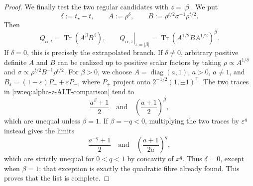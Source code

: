 \documentclass[11pt]{article}
\theoremstyle{remark}
\newcommand{\1}{\mathbbm{1}}
\begin{document}
\begin{proof}
We finally test the two regular candidates with
$z=\lvert\beta\rvert$.  We put
\begin{equation}
 \delta:=t_\star-t,\qquad
 A:=\rho^\delta,\qquad
 B:=\rho^{t/2}\sigma^{-1}\rho^{t/2}.
 \label{rw:eq:real-t-ALT-variables}
\end{equation}
Then
\begin{equation}
 Q_{\alpha,t}=\operatorname{Tr}(A^\beta B^\beta),
 \qquad
 \left.Q_{\alpha,z}\right|_{z=\lvert\beta\rvert}
 =\operatorname{Tr}(A^{1/2}BA^{1/2})^\beta.
 \label{rw:eq:alpha-z-ALT-comparison}
\end{equation}
If $\delta=0$, this is precisely the extrapolated branch.  If
$\delta\neq0$, arbitrary positive definite $A$ and $B$ can be
realized up to positive scalar factors by taking
$\rho\propto A^{1/\delta}$ and
$\sigma\propto\rho^{t/2}B^{-1}\rho^{t/2}$.
For $\beta>0$, we choose $A=\operatorname{diag}(a,1)$, $a>0$,
$a\neq1$, and
$B_\varepsilon=(1-\varepsilon)P_++\varepsilon P_-$, where
$P_\pm$ project onto $2^{-1/2}(1,\pm1)^{\mathsf T}$.  The two traces
in \eqref{rw:eq:alpha-z-ALT-comparison} tend to
\begin{equation}
 \frac{a^\beta+1}{2}
 \quad\text{and}\quad
 \left(\frac{a+1}{2}\right)^\beta,
 \label{rw:eq:alpha-z-strict-witness}
\end{equation}
which are unequal unless $\beta=1$.  If $\beta=-q<0$, multiplying
the two traces by $\varepsilon^q$ instead gives the limits
\begin{equation}
 \frac{a^{-q}+1}{2}
 \quad\text{and}\quad
 \left(\frac{a+1}{2a}\right)^q,
 \label{rw:eq:alpha-z-negative-strict-witness}
\end{equation}
which are strictly unequal for $0<q<1$ by concavity of $x^q$.
Thus $\delta=0$, except when $\beta=1$; that exception is exactly the
quadratic fibre already found.  This proves that the list is complete.
\end{proof}
\end{document}
